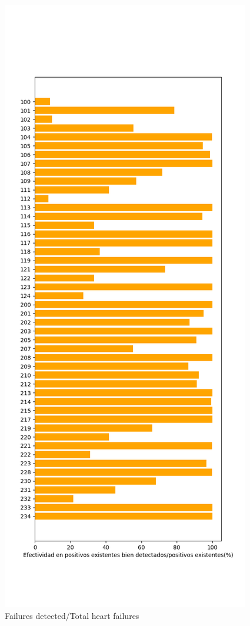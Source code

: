 \documentclass[conference]{IEEEtran}
\begin{document}
\begin{figure}[H]
\centerline{\includegraphics[scale=0.4]{imagenes/EfectividadExistentes}}
\caption{Failures detected/Total heart failures}
\label{fig}
\end{figure}
\end{document}
